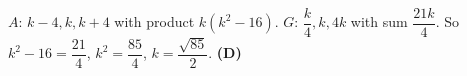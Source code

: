 $A$: $k-4,k,k+4$ with product $k(k^2-16)$. $G$: $\dfrac k4,k,4k$ with sum $\dfrac{21k}4$. So $k^2-16=\dfrac{21}4$, $k^2=\dfrac{85}4$, $k=\dfrac{\sqrt{85}}2$. \textbf{(D)}
